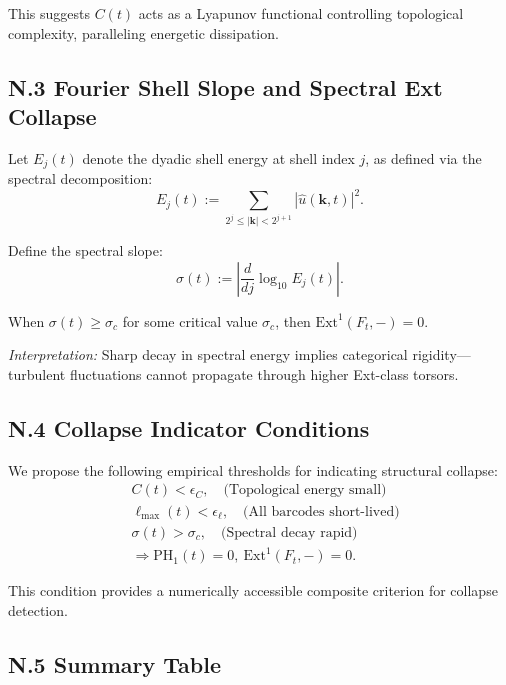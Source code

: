 \documentclass[11pt]{article}
\theoremstyle{definition}
\begin{document}
This suggests \( C(t) \) acts as a Lyapunov functional controlling topological complexity, paralleling energetic dissipation.

\subsection*{N.3 Fourier Shell Slope and Spectral Ext Collapse}

Let \( E_j(t) \) denote the dyadic shell energy at shell index \( j \), as defined via the spectral decomposition:
\[
E_j(t) := \sum_{2^j \leq |\mathbf{k}| < 2^{j+1}} |\hat{u}(\mathbf{k},t)|^2.
\]

Define the spectral slope:
\[
\sigma(t) := \left| \frac{d}{dj} \log_{10} E_j(t) \right|.
\]

\begin{conjecture}
When \( \sigma(t) \geq \sigma_c \) for some critical value \( \sigma_c \), then \( \mathrm{Ext}^1(F_t, -) = 0 \).
\end{conjecture}

\textit{Interpretation:} Sharp decay in spectral energy implies categorical rigidity—turbulent fluctuations cannot propagate through higher Ext-class torsors.

\subsection*{N.4 Collapse Indicator Conditions}

We propose the following empirical thresholds for indicating structural collapse:
\[
\begin{aligned}
& C(t) < \epsilon_C, \quad \text{(Topological energy small)} \\
& \ell_{\max}(t) < \epsilon_\ell, \quad \text{(All barcodes short-lived)} \\
& \sigma(t) > \sigma_c, \quad \text{(Spectral decay rapid)} \\
& \Rightarrow \mathrm{PH}_1(t) = 0,\ \mathrm{Ext}^1(F_t, -) = 0.
\end{aligned}
\]

This condition provides a numerically accessible composite criterion for collapse detection.

\subsection*{N.5 Summary Table}
\end{document}
